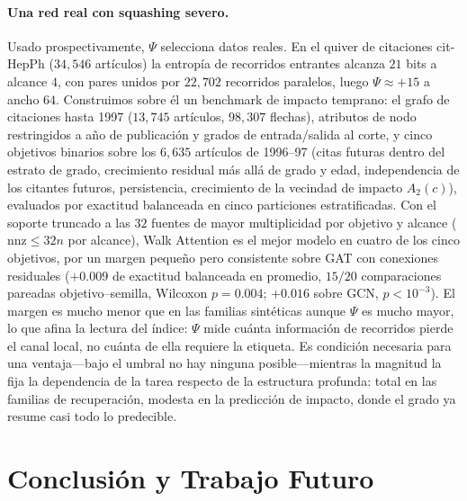 \documentclass[runningheads]{llncs}
\begin{document}
\paragraph{Una red real con squashing severo.}
Usado prospectivamente, $\Psi$ selecciona datos reales. En el quiver de
citaciones cit-HepPh \cite{leskovec2005graphs} ($34{,}546$ artículos) la
entropía de recorridos entrantes alcanza $21$ bits a alcance $4$, con pares
unidos por $22{,}702$ recorridos paralelos, luego $\Psi\approx+15$ a ancho
$64$. Construimos sobre él un benchmark de impacto temprano: el grafo de
citaciones hasta 1997 ($13{,}745$ artículos, $98{,}307$ flechas), atributos de
nodo restringidos a año de publicación y grados de entrada/salida al corte, y
cinco objetivos binarios sobre los $6{,}635$ artículos de 1996--97 (citas
futuras dentro del estrato de grado, crecimiento residual más allá de grado y
edad, independencia de los citantes futuros, persistencia, crecimiento de la
vecindad de impacto $A_2(c)$), evaluados por exactitud balanceada en cinco
particiones estratificadas. Con el soporte truncado a las $32$ fuentes de mayor
multiplicidad por objetivo y alcance ($\mathrm{nnz}\le32n$ por alcance), Walk
Attention es el mejor modelo en cuatro de los cinco objetivos, por un margen
pequeño pero consistente sobre GAT con conexiones residuales ($+0.009$ de
exactitud balanceada en promedio, $15/20$ comparaciones pareadas
objetivo--semilla, Wilcoxon $p=0.004$; $+0.016$ sobre GCN, $p<10^{-3}$). El
margen es mucho menor que en las familias sintéticas aunque $\Psi$ es mucho
mayor, lo que afina la lectura del índice: $\Psi$ mide cuánta información de
recorridos pierde el canal local, no cuánta de ella requiere la etiqueta. Es
condición necesaria para una ventaja---bajo el umbral no hay ninguna
posible---mientras la magnitud la fija la dependencia de la tarea respecto de
la estructura profunda: total en las familias de recuperación, modesta en la
predicción de impacto, donde el grado ya resume casi todo lo predecible.

\section{Conclusión y Trabajo Futuro}\label{sec:conclusion}
\end{document}
